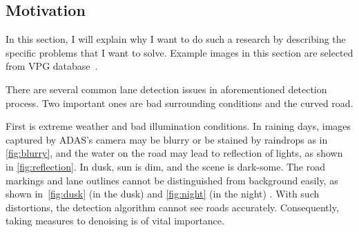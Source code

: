 \begin{spacing}{1.5}
\section{Motivation}
\label{sec:IN_motivation}

In this section, I will explain why I want to do such a research by describing the specific problems that I want to solve. Example images in this section are selected from VPG database~\cite{lee2017vpgnet}.

There are several common lane detection issues in aforementioned detection process. Two important ones are bad surrounding conditions and the curved road.

First is extreme weather and bad illumination conditions. In raining days, images captured by ADAS’s camera may be blurry or be stained by raindrops as in \autoref{fig:blurry}, and the water on the road may lead to reflection of lights, as shown in \autoref{fig:reflection}. In dusk, sun is dim, and the scene is dark-some. The road markings and lane outlines cannot be distinguished from background easily, as shown in~\autoref{fig:dusk} (in the dusk) and \autoref{fig:night} (in the night) . With such distortions, the detection algorithm cannot see roads accurately. Consequently, taking measures to denoising is of vital importance. 



\end{spacing}
